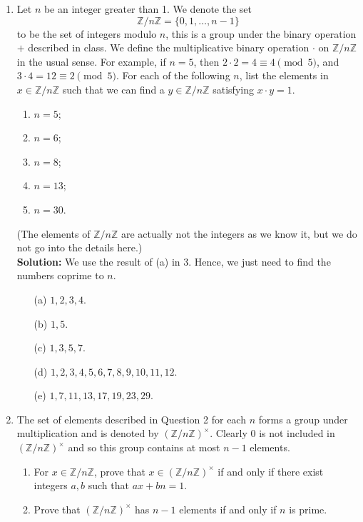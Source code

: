 \begin{enumerate}
    \item Let $n$ be an integer greater than 1. We denote the set
    \[
    \mathbb{Z}/n\mathbb{Z} = \{ 0,1,\dots,n-1 \}
    \]
    to be the set of integers modulo $n$, this is a group under the binary operation $+$
    described in class. We define the multiplicative binary operation $\cdot$ on
    $\mathbb{Z}/n\mathbb{Z}$ in the usual sense. For example, if $n=5$, then
    $2\cdot 2 = 4 \equiv 4 \pmod{5}$, and $3 \cdot 4 = 12 \equiv 2 \pmod{5}$.
    For each of the following $n$, list the elements in $x \in \mathbb{Z}/n\mathbb{Z}$
    such that we can find a $y \in \mathbb{Z}/n\mathbb{Z}$ satisfying $x \cdot y = 1$.
    \begin{enumerate}
        \item $n=5$;
        \item $n=6$;
        \item $n=8$;
        \item $n=13$;
        \item $n=30$.
    \end{enumerate}
    (The elements of $\mathbb{Z}/n\mathbb{Z}$ are actually not the integers as we know it,
    but we do not go into the details here.) \\
    \textbf{Solution:} We use the result of (a) in 3. Hence, we just need to find the numbers coprime to \(n\). 
    \begin{itemize}
        \item [(a)] \(1,2,3,4\). 
        \item [(b)] \(1, 5\). 
        \item [(c)] \(1,3,5,7\). 
        \item [(d)] \(1,2,3,4,5,6,7,8,9,10,11,12\). 
        \item [(e)] \(1,7,11,13,17,19,23,29\).     
    \end{itemize} 
    \item The set of elements described in Question 2 for each $n$ forms a group under
    multiplication and is denoted by $(\mathbb{Z}/n\mathbb{Z})^\times$. Clearly $0$
    is not included in $(\mathbb{Z}/n\mathbb{Z})^\times$ and so this group contains
    at most $n-1$ elements.
    \begin{enumerate}
        \item For $x \in \mathbb{Z}/n\mathbb{Z}$, prove that $x \in (\mathbb{Z}/n\mathbb{Z})^\times$
              if and only if there exist integers $a,b$ such that $ax + bn = 1$.
        \item Prove that $(\mathbb{Z}/n\mathbb{Z})^\times$ has $n-1$ elements if and only if $n$ is prime.

\end{enumerate}
\end{enumerate}
